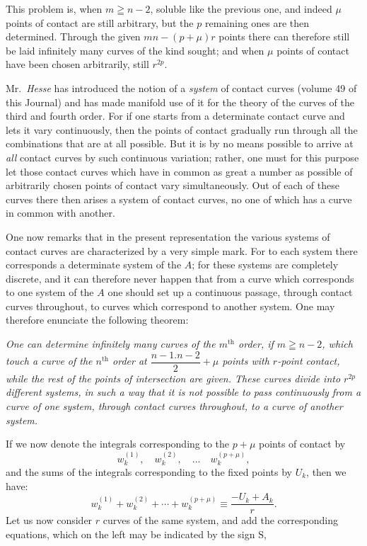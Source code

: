 \documentclass{article}
\begin{document}
This problem is, when $m \geqq n-2$, soluble like the previous one, and indeed $\mu$ points of contact are still arbitrary, but the $p$ remaining ones are then determined. Through the given $mn - (p+\mu)r$ points there can therefore still be laid infinitely many curves of the kind sought; and when $\mu$ points of contact have been chosen arbitrarily, still $r^{2p}$.

Mr.\ \emph{Hesse} has introduced the notion of a \emph{system} of contact curves (volume 49 of this Journal) and has made manifold use of it for the theory of the curves of the third and fourth order. For if one starts from a determinate contact curve and lets it vary continuously, then the points of contact gradually run through all the combinations that are at all possible. But it is by no means possible to arrive at \emph{all} contact curves by such continuous variation; rather, one must for this purpose let those contact curves which have in common as great a number as possible of arbitrarily chosen points of contact vary simultaneously. Out of each of these curves there then arises a system of contact curves, no one of which has a curve in common with another.

One now remarks that in the present representation the various systems of contact curves are characterized by a very simple mark. For to each system there corresponds a determinate system of the $A$; for these systems are completely discrete, and it can therefore never happen that from a curve which corresponds to one system of the $A$ one should set up a continuous passage, through contact curves throughout, to curves which correspond to another system. One may therefore enunciate the following theorem:

\emph{One can determine infinitely many curves of the $m^{\text{th}}$ order, if $m \geqq n-2$, which touch a curve of the $n^{\text{th}}$ order at $\dfrac{n-1.n-2}{2} + \mu$ points with $r$-point contact, while the rest of the points of intersection are given. These curves divide into $r^{2p}$ different systems, in such a way that it is not possible to pass continuously from a curve of one system, through contact curves throughout, to a curve of another system.}

If we now denote the integrals corresponding to the $p+\mu$ points of contact by
\[ w_{k}^{(1)}, \quad w_{k}^{(2)}, \quad \ldots \quad w_{k}^{(p+\mu)}, \]
and the sums of the integrals corresponding to the fixed points by $U_{k}$, then we have:
\[ w_{k}^{(1)} + w_{k}^{(2)} + \cdots + w_{k}^{(p+\mu)} \equiv \frac{-U_{k} + A_{k}}{r}. \]
Let us now consider $r$ curves of the same system, and add the corresponding equations, which on the left may be indicated by the sign $\mathrm{S}$,
\end{document}
